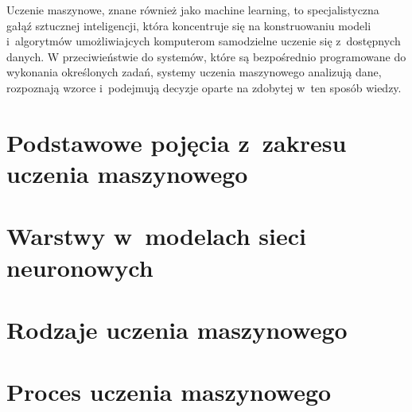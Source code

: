 Uczenie maszynowe, znane również jako machine learning, to specjalistyczna gałąź sztucznej inteligencji,
która koncentruje się na konstruowaniu modeli i~algorytmów umożliwiajcych komputerom samodzielne uczenie się z~dostępnych danych.
W przeciwieństwie do systemów, które są bezpośrednio programowane do wykonania określonych zadań,
systemy uczenia maszynowego analizują dane, rozpoznają wzorce i~podejmują decyzje oparte na zdobytej w~ten sposób wiedzy.

\section{Podstawowe pojęcia z~zakresu uczenia maszynowego}


\section{Warstwy w~modelach sieci neuronowych}


\section{Rodzaje uczenia maszynowego}


\section{Proces uczenia maszynowego}

